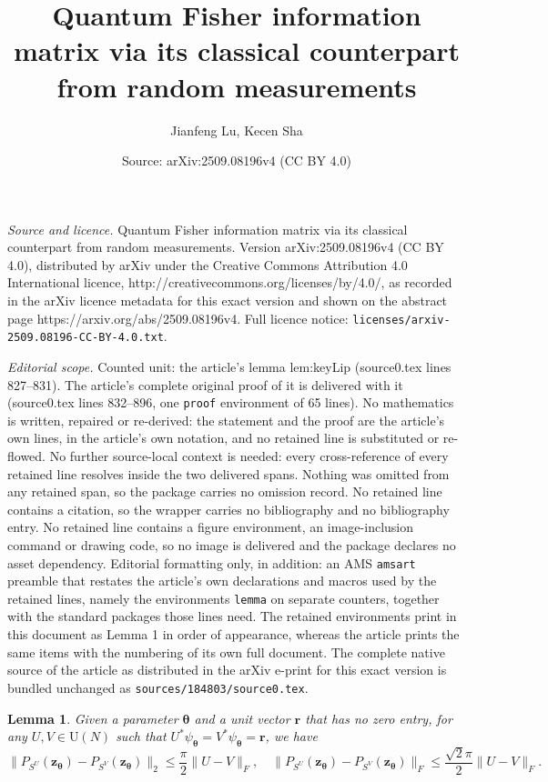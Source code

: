 \documentclass[10pt,a4paper]{amsart}
\title{Quantum Fisher information matrix via its classical counterpart from random measurements}
\author{Jianfeng Lu, Kecen Sha}
\date{Source: arXiv:2509.08196v4 (CC BY 4.0)}
\newtheorem{lemma}{Lemma}
\begin{document}
\maketitle

\noindent\emph{Source and licence.} Quantum Fisher information matrix via its classical counterpart from random measurements. Version arXiv:2509.08196v4 (CC BY 4.0), distributed by arXiv under the Creative Commons Attribution 4.0 International licence, http://creativecommons.org/licenses/by/4.0/, as recorded in the arXiv licence metadata for this exact version and shown on the abstract page https://arxiv.org/abs/2509.08196v4. Full licence notice: \texttt{licenses/arxiv-2509.08196-CC-BY-4.0.txt}.\par\smallskip

\noindent\textit{Editorial scope.} Counted unit: the article's lemma lem:keyLip (source0.tex lines 827--831). The article's complete original proof of it is delivered with it (source0.tex lines 832--896, one \texttt{proof} environment of 65 lines). No mathematics is written, repaired or re-derived: the statement and the proof are the article's own lines, in the article's own notation, and no retained line is substituted or re-flowed.  No further source-local context is needed: every cross-reference of every retained line resolves inside the two delivered spans.  Nothing was omitted from any retained span, so the package carries no omission record.  No retained line contains a citation, so the wrapper carries no bibliography and no bibliography entry.  No retained line contains a figure environment, an image-inclusion command or drawing code, so no image is delivered and the package declares no asset dependency.  Editorial formatting only, in addition: an AMS \texttt{amsart} preamble that restates the article's own declarations and macros used by the retained lines, namely the environments \texttt{lemma} on separate counters, together with the standard packages those lines need.  The retained environments print in this document as Lemma 1 in order of appearance, whereas the article prints the same items with the numbering of its own full document.  The complete native source of the article as distributed in the arXiv e-print for this exact version is bundled unchanged as \texttt{sources/184803/source0.tex}.
\begin{lemma}
\label{lem:keyLip}
    Given a parameter $\bm\theta$ and a unit vector $\bm r$ that has no zero entry, for any $U,V\in \mathrm U(N)$ such that $U^*\psi_{\bm\theta}=V^*\psi_{\bm\theta}=\bm r$, we have 
    \[\|P_{S^U}(\bm z_{\bm\theta})-P_{S^V}(\bm z_{\bm\theta})\|_2\leq \frac{\pi}{2}\|U-V\|_F,\quad \|P_{S^U}(\bm z_{\bm\theta})-P_{S^V}(\bm z_{\bm\theta})\|_F\leq \frac{\sqrt 2\pi}{2}\|U-V\|_F.\]
\end{lemma}
\end{document}

